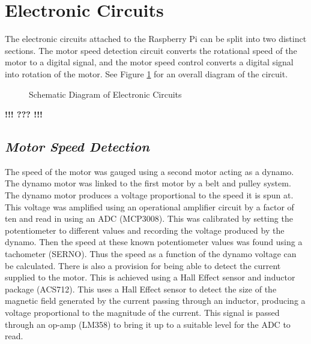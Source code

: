\documentclass[twoside,a4]{report}
\def\br{\newline \newline \noindent}
\def\cbh{\large\bfseries !!! ??? !!! \normalsize\normalfont}
\begin{document}
	\section{Electronic Circuits} %
	The electronic circuits attached to the Raspberry Pi can be split into two distinct sections. The motor speed detection circuit converts the rotational speed of the motor to a digital signal, and the motor speed control converts a digital signal into rotation of the motor. See Figure \ref{circfull} for an overall diagram of the circuit.
	\begin{figure}[!htb]
		\centering
		\caption{Schematic Diagram of Electronic Circuits}
		\label{circfull}
	\end{figure}
	\cbh %

	\subsection*{\textit{Motor Speed Detection}} %
	The speed of the motor was gauged using a second motor acting as a dynamo. The dynamo motor was linked to the first motor by a belt and pulley system. The dynamo motor produces a voltage proportional to the speed it is spun at. This voltage was amplified using an operational amplifier circuit by a factor of ten and read in using an ADC (MCP3008). This was calibrated by setting the potentiometer to different values and recording the voltage produced by the dynamo. Then the speed at these known potentiometer values was found using a tachometer (SERNO). Thus the speed as a function of the dynamo voltage can be calculated. \br
	There is also a provision for being able to detect the current supplied to the motor. This is achieved using a Hall Effect sensor and inductor package (ACS712). This uses a Hall Effect sensor to detect the size of the magnetic field generated by the current passing through an inductor, producing a voltage proportional to the magnitude of the current. This signal is passed through an op-amp (LM358) to bring it up to a suitable level for the ADC to read.
	
\end{document}
